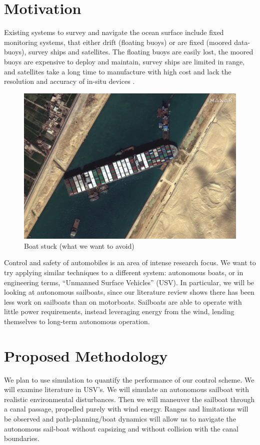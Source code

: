 \documentclass[conference]{IEEEtran}
\begin{document}
\section{Motivation}
 Existing systems to survey and navigate the ocean surface include fixed monitoring systems, that either drift (floating buoys) or are fixed (moored data-buoys), survey ships and satellites. The floating buoys are easily lost, the moored buoys are expensive to deploy and maintain, survey ships are limited in range, and satellites take a long time to manufacture with high cost and lack the resolution and accuracy of in-situ devices \cite{Sauze2006}.
\begin{figure}
    \centering
    \includegraphics{documents/proposal/Suez_Canal_blocked_by_Ever_Given_March_27_2021.jpg}
    \caption{Boat stuck (what we want to avoid)\label{fig:boat_stuck}}
\end{figure}
Control and safety of automobiles is an area of intense research focus. We want to try applying similar techniques to a different system: autonomous boats, or in engineering terms, \enquote{Unmanned Surface Vehicles} (USV). In particular, we will be looking at autonomous sailboats, since our literature review shows there has been less work on sailboats than on motorboats.
Sailboats are able to operate with little power requirements, instead leveraging energy from the wind, lending themselves to long-term autonomous operation.

\section{Proposed Methodology}
We plan to use simulation to quantify the performance of our control scheme. We will examine literature in USV's.
We will simulate an autonomous sailboat with realistic environmental disturbances.
Then we will maneuver the sailboat through a canal passage, propelled purely with wind energy. Ranges and limitations will be observed and path-planning/boat dynamics will allow us to navigate the autonomous sail-boat without capsizing and without collision with the canal boundaries. 
\end{document}
